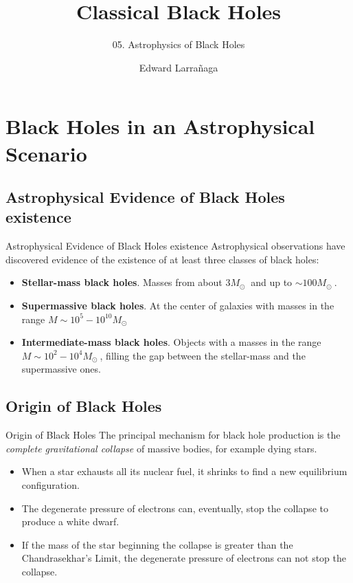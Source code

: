 \documentclass{beamer}
\title{Classical Black Holes} %
\subtitle{05. Astrophysics of Black Holes} %
\author{Edward Larra\~{n}aga}
\begin{document}
\frame{\maketitle}


\section{Black Holes in an Astrophysical Scenario}

\subsection{Astrophysical Evidence of Black Holes existence}
\begin{frame}{Astrophysical Evidence of Black Holes existence}
	Astrophysical observations have discovered evidence of the existence of at least three classes of black holes:
	\begin{itemize}
	\item<2-> \textbf{Stellar-mass black holes}. Masses from about $3 M_\odot\ $ and up to $\sim 100 M_\odot\ $.  
    \item<3-> \textbf{Supermassive black holes}. At the center of galaxies with  masses in the range $M \sim 10^5 - 10^{10} M_\odot\ $
    \item<4-> \textbf{Intermediate-mass black holes}. Objects with a masses in the range $M \sim 10^2 - 10^4 M_\odot\ $, filling the gap between the stellar-mass and the supermassive ones.
    \end{itemize}
\end{frame}

\subsection{Origin of Black Holes}
\begin{frame}{Origin of Black Holes}
	The principal mechanism for black hole production is the \textit{complete gravitational collapse} of massive bodies, for example dying stars.
	\begin{itemize}
    \item<2-4> When a star exhausts all its nuclear fuel, it shrinks to find a new equilibrium configuration.
    \item<3-4> The degenerate pressure of electrons can, eventually, stop the collapse to produce a white dwarf.
	\item<4-4> If the mass of the star beginning the collapse is greater than the Chandrasekhar's Limit, the degenerate pressure of electrons can not stop the collapse.
    \end{itemize}
\end{frame}
\end{document}
